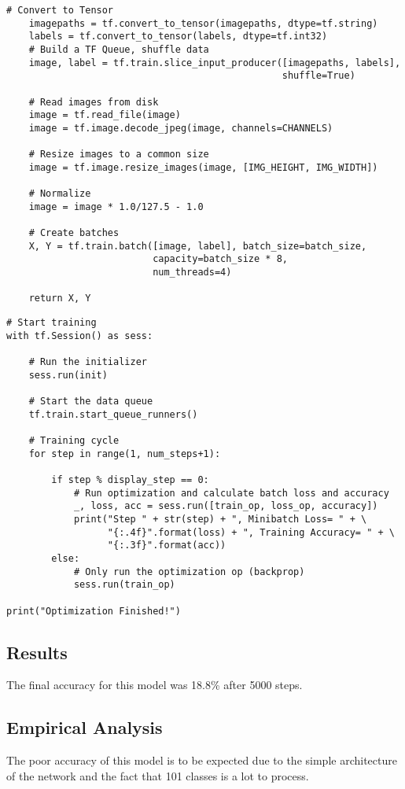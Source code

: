 \begin{lstlisting}[style=Python]
# Convert to Tensor
    imagepaths = tf.convert_to_tensor(imagepaths, dtype=tf.string)
    labels = tf.convert_to_tensor(labels, dtype=tf.int32)
    # Build a TF Queue, shuffle data
    image, label = tf.train.slice_input_producer([imagepaths, labels],
                                                 shuffle=True)

    # Read images from disk
    image = tf.read_file(image)
    image = tf.image.decode_jpeg(image, channels=CHANNELS)

    # Resize images to a common size
    image = tf.image.resize_images(image, [IMG_HEIGHT, IMG_WIDTH])

    # Normalize
    image = image * 1.0/127.5 - 1.0

    # Create batches
    X, Y = tf.train.batch([image, label], batch_size=batch_size,
                          capacity=batch_size * 8,
                          num_threads=4)

    return X, Y

\end{lstlisting}

\begin{lstlisting}[style=Python]
# Start training
with tf.Session() as sess:

    # Run the initializer
    sess.run(init)

    # Start the data queue
    tf.train.start_queue_runners()

    # Training cycle
    for step in range(1, num_steps+1):

        if step % display_step == 0:
            # Run optimization and calculate batch loss and accuracy
            _, loss, acc = sess.run([train_op, loss_op, accuracy])
            print("Step " + str(step) + ", Minibatch Loss= " + \
                  "{:.4f}".format(loss) + ", Training Accuracy= " + \
                  "{:.3f}".format(acc))
        else:
            # Only run the optimization op (backprop)
            sess.run(train_op)

print("Optimization Finished!")
\end{lstlisting}

\subsection*{Results}
The final accuracy for this model was 18.8\% after 5000 steps.

\subsection*{Empirical Analysis}
The poor accuracy of this model is to be expected due to the simple architecture of the network and the fact that 101 classes is a lot to process.